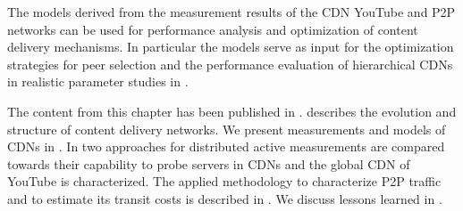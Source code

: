 
The models derived from the measurement results of the CDN YouTube and P2P networks can be used for performance analysis and optimization of content delivery mechanisms.
In particular the models serve as input for the optimization strategies for peer selection and the performance evaluation of hierarchical CDNs in realistic parameter studies in .

The content from this chapter has been published in \cite{burger2012profit,burger2014vantage,burger2016hierarchical}.
 describes the evolution and structure of content delivery networks.
We present measurements and models of CDNs in .
In  two approaches for distributed active measurements are compared towards their capability to probe servers in CDNs and the global CDN of YouTube is characterized.
The applied methodology to characterize P2P traffic and to estimate its transit costs is described in .
We discuss lessons learned in .





%

